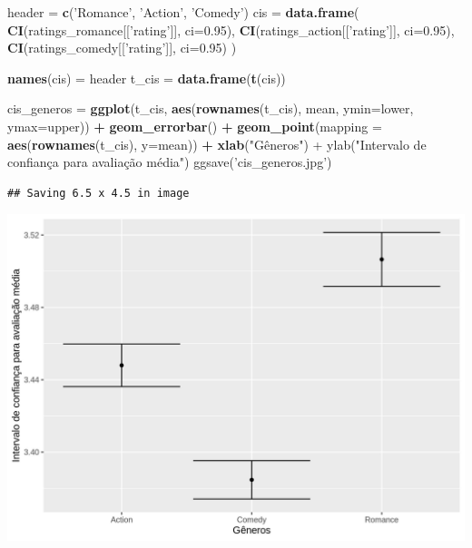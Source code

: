 \documentclass[]{article}
\newenvironment{Shaded}{\begin{snugshade}}{\end{snugshade}}
\newcommand{\DataTypeTok}[1]{\textcolor[rgb]{0.13,0.29,0.53}{#1}}
\newcommand{\FloatTok}[1]{\textcolor[rgb]{0.00,0.00,0.81}{#1}}
\newcommand{\KeywordTok}[1]{\textcolor[rgb]{0.13,0.29,0.53}{\textbf{#1}}}
\newcommand{\NormalTok}[1]{#1}
\newcommand{\OperatorTok}[1]{\textcolor[rgb]{0.81,0.36,0.00}{\textbf{#1}}}
\newcommand{\StringTok}[1]{\textcolor[rgb]{0.31,0.60,0.02}{#1}}
\begin{document}
\begin{Shaded}
\begin{Highlighting}[]
\NormalTok{  header =}\StringTok{ }\KeywordTok{c}\NormalTok{(}\StringTok{'Romance'}\NormalTok{, }\StringTok{'Action'}\NormalTok{, }\StringTok{'Comedy'}\NormalTok{)}
\NormalTok{  cis =}\StringTok{  }\KeywordTok{data.frame}\NormalTok{(}
            \KeywordTok{CI}\NormalTok{(ratings_romance[[}\StringTok{'rating'}\NormalTok{]], }\DataTypeTok{ci=}\FloatTok{0.95}\NormalTok{),}
            \KeywordTok{CI}\NormalTok{(ratings_action[[}\StringTok{'rating'}\NormalTok{]], }\DataTypeTok{ci=}\FloatTok{0.95}\NormalTok{), }
            \KeywordTok{CI}\NormalTok{(ratings_comedy[[}\StringTok{'rating'}\NormalTok{]], }\DataTypeTok{ci=}\FloatTok{0.95}\NormalTok{)}
\NormalTok{          )  }
  
  \KeywordTok{names}\NormalTok{(cis) =}\StringTok{ }\NormalTok{header}
\NormalTok{  t_cis =}\StringTok{ }\KeywordTok{data.frame}\NormalTok{(}\KeywordTok{t}\NormalTok{(cis))}


\NormalTok{  cis_generos =}\StringTok{ }\KeywordTok{ggplot}\NormalTok{(t_cis, }\KeywordTok{aes}\NormalTok{(}\KeywordTok{rownames}\NormalTok{(t_cis), mean, }\DataTypeTok{ymin=}\NormalTok{lower, }\DataTypeTok{ymax=}\NormalTok{upper)) }\OperatorTok{+}
\StringTok{    }\KeywordTok{geom_errorbar}\NormalTok{() }\OperatorTok{+}
\StringTok{    }\KeywordTok{geom_point}\NormalTok{(}\DataTypeTok{mapping =} \KeywordTok{aes}\NormalTok{(}\KeywordTok{rownames}\NormalTok{(t_cis), }\DataTypeTok{y=}\NormalTok{mean)) }\OperatorTok{+}
\StringTok{    }\KeywordTok{xlab}\NormalTok{(}\StringTok{"Gêneros") + ylab("}\NormalTok{Intervalo de confiança para avaliação média}\StringTok{")}
\StringTok{  ggsave('cis_generos.jpg')}
\end{Highlighting}
\end{Shaded}

\begin{verbatim}
## Saving 6.5 x 4.5 in image
\end{verbatim}

\includegraphics{./cis_generos.jpg}
\end{document}
